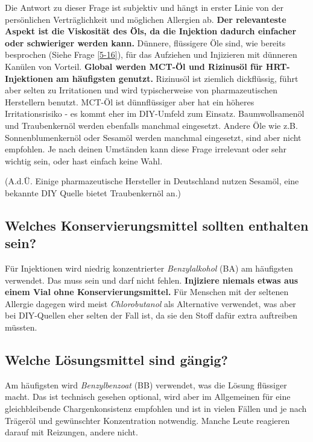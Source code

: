 \documentclass{article}
\begin{document}
Die Antwort zu dieser Frage ist subjektiv und hängt in erster Linie von der persönlichen Verträglichkeit und möglichen Allergien ab. \textbf{Der relevanteste Aspekt ist die Viskosität des Öls, da die Injektion dadurch einfacher oder schwieriger werden kann.} Dünnere, flüssigere Öle sind, wie bereits besprochen (Siehe Frage \ref{5-16}), für das Aufziehen und Injizieren mit dünneren Kanülen von Vorteil. \textbf{Global werden MCT-Öl und Rizinusöl für HRT-Injektionen am häufigsten genutzt. }Rizinusöl ist ziemlich dickflüssig, führt aber selten zu Irritationen und wird typischerweise von pharmazeutischen Herstellern benutzt. MCT-Öl ist dünnflüssiger aber hat ein höheres Irritationsrisiko - es kommt eher im DIY-Umfeld zum Einsatz. Baumwollsamenöl und Traubenkernöl werden ebenfalls manchmal eingesetzt. Andere Öle wie z.B. Sonnenblumenkernöl oder Sesamöl werden manchmal eingesetzt, sind aber nicht empfohlen. Je nach deinen Umständen kann diese Frage irrelevant oder sehr wichtig sein, oder hast einfach keine Wahl. 

(A.d.Ü. Einige pharmazeutische Hersteller in Deutschland nutzen Sesamöl, eine bekannte DIY Quelle bietet Traubenkernöl an.)

\subsection{Welches Konservierungsmittel sollten enthalten sein?}\label{6-17}

Für Injektionen wird niedrig konzentrierter \textit{Benzylalkohol} (BA) am häufigsten verwendet. Das muss sein und darf nicht fehlen. \textbf{Injiziere niemals etwas aus einem Vial ohne Konservierungsmittel. }Für Menschen mit der seltenen Allergie dagegen wird meist \textit{Chlorobutanol }als Alternative verwendet, was aber bei DIY-Quellen eher selten der Fall ist, da sie den Stoff dafür extra auftreiben müssten.

\subsection{Welche Lösungsmittel sind gängig?}

Am häufigsten wird \textit{Benzylbenzoat} (BB) verwendet, was die Lösung flüssiger macht. Das ist technisch gesehen optional, wird aber im Allgemeinen für eine gleichbleibende Chargenkonsistenz empfohlen und ist in vielen Fällen und je nach Trägeröl und gewünschter Konzentration notwendig. Manche Leute reagieren darauf mit Reizungen, andere nicht.
\end{document}
